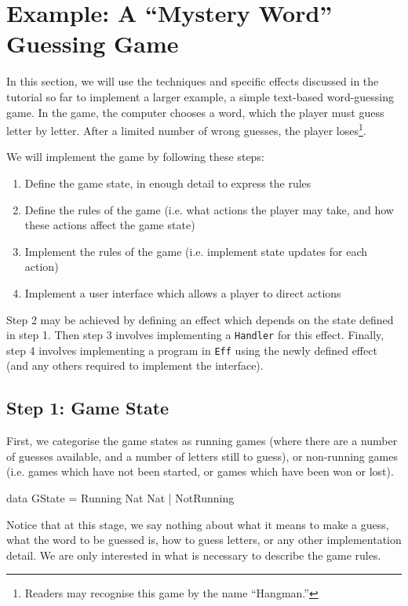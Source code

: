 \section{Example: A ``Mystery Word'' Guessing Game}

\label{sect:hangman}

In this section, we will use the techniques and specific effects discussed
in the tutorial so far to implement a larger example, a simple text-based
word-guessing game. In the game, the computer chooses a word, which the
player must guess letter by letter. After a limited number of wrong
guesses, the player loses\footnote{Readers may recognise this game
by the name ``Hangman.''}.

We will implement the game by following these steps:

\begin{enumerate}
\item Define the game state, in enough detail to express the rules
\item Define the rules of the game (i.e. what actions the player may take, 
and how these actions affect the game state)
\item Implement the rules of the game (i.e. implement state updates for each 
action)
\item Implement a user interface which allows a player to direct actions
\end{enumerate}

\noindent
Step 2 may be achieved by defining an effect which depends on the state defined
in step 1. Then step 3 involves implementing a \texttt{Handler} for this effect.
Finally, step 4 involves implementing a program in \texttt{Eff} using the
newly defined effect (and any others required to implement the interface).

\subsection{Step 1: Game State}

First, we categorise the game states as running games (where there are a 
number of guesses available, and a number of letters still to guess), or
non-running games (i.e. games which have not been started, or games which
have been won or lost).

\begin{code}
data GState = Running Nat Nat | NotRunning
\end{code}

\noindent
Notice that at this stage, we say nothing about what it means to make a guess,
what the word to be guessed is, how to guess letters, or any other implementation
detail. We are only interested in what is necessary to describe the game
rules.

